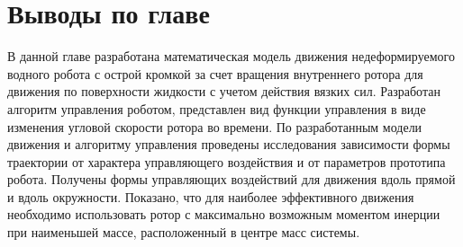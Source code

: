 

\section{Выводы по главе}

В данной главе разработана математическая модель движения недеформируемого водного робота с острой кромкой за счет вращения внутреннего ротора для движения по поверхности жидкости с учетом действия вязких сил. Разработан алгоритм управления роботом, представлен вид функции управления в виде изменения угловой скорости ротора во времени. По разработанным модели движения и алгоритму управления проведены исследования зависимости формы траектории от характера управляющего воздействия и от параметров прототипа робота. Получены формы управляющих воздействий для движения вдоль прямой и вдоль окружности. Показано, что для наиболее эффективного движения необходимо использовать ротор с максимально возможным моментом инерции при наименьшей массе, расположенный в центре масс системы.


\clearpage
